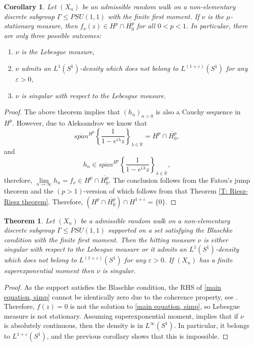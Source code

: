 \documentclass[11pt]{article}
\newtheorem{theorem}{Theorem}[section]
\newtheorem{corollary}{Corollary}[section]
\begin{document}
\begin{corollary}
	Let $(X_n)$ be an admissible random walk on a non-elementary discrete subgroup $\Gamma \leq PSU(1,1)$ with the finite first moment. If $\nu$ is the $\mu$-stationary measure, then $f_\nu(z) \in H^p \cap \overline{H^p_0}$ for all $0 < p < 1$. In particular, there are only three possible outcomes:
	\begin{enumerate}
		\item $\nu$ is the Lebesgue measure,
		\item $\nu$ admits an $L^1(S^1)$-density which does not belong to $L^{(1+\varepsilon)}(S^1)$ for any $\varepsilon > 0$,
		\item $\nu$ is singular with respect to the Lebesgue measure.
	\end{enumerate}
\end{corollary}
\begin{proof}
	The above theorem implies that $(h_n)_{n > 0}$ is also a Cauchy sequence in $H^p$. However, due to Aleksandrov we know that
	\[
	\overline{span}^{H^p} \left\lbrace \frac{1}{1 - e^{i\lambda} z} \right\rbrace_{\lambda \in \mathbb{R}} = H^p \cap \overline{H^p_0},
	\]
	and
	\[
	h_n \in \overline{span}^{H^p} \left\lbrace \frac{1}{1 - e^{i\lambda} z} \right\rbrace_{\lambda \in \mathbb{R}},
	\]
	therefore, $\lim\limits_{n \rightarrow \infty} h_n = f_\nu \in H^p \cap \overline{H^p_0}$. The conclusion follows from the Fatou's jump theorem and the $(p > 1)$-version of \cite[Corollary 6.2.12]{cimahardy} which follows from that Theorem \ref{T: Riesz-Riesz theorem}. Therefore, $(H^p \cap \overline{H^p_0}) \cap H^{1 + \varepsilon} = \{0\}$. 
\end{proof}

\begin{theorem}
	Let $(X_n)$ be a admissible random walk on a non-elementary discrete subgroup $\Gamma \leq PSU(1,1)$ supported on a set satisfying the Blaschke condition with the finite first moment. Then the hitting measure $\nu$ is either singular with respect to the Lebesgue measure or it admits an $L^1(S^1)$-density which does not belong to $L^{(1+\varepsilon)}(S^1)$ for any $\varepsilon > 0$. If $(X_n)$ has a finite superexponential moment then $\nu$ is singular.
\end{theorem}
\begin{proof}
	As the support satisfies the Blaschke condition, the RHS of \eqref{main equation, simp} cannot be identically zero due to the coherence property, see \cite[Proposition 4.2.14]{Shapiro1968}. Therefore, $f(z) = 0$ is not the solution to \eqref{main equation, simp}, so Lebesgue measure is not stationary. Assuming superexponential moment, \cite[Theorem 1.5(iii)]{blachere2011harmonic} implies that if $\nu$ is absolutely continuous, then the density is in $L^\infty(S^1)$. In particular, it belongs to $L^{1 + \varepsilon}(S^1)$, and the previous corollary shows that this is impossible.
\end{proof}
\end{document}
